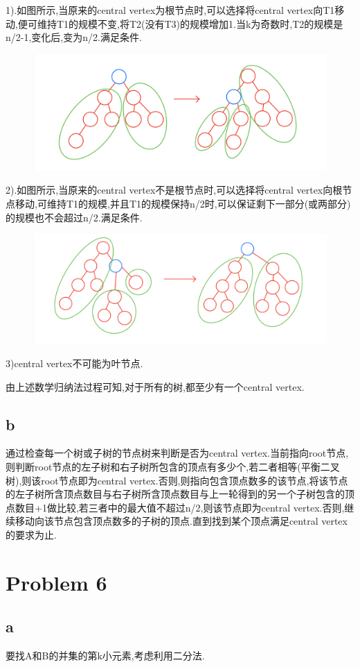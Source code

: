 \documentclass[12pt,a4paper,fontset=none]{ctexart}
\begin{document}
1).如图所示,当原来的central vertex为根节点时,可以选择将central vertex向T1移动,便可维持T1的规模不变,将T2(没有T3)的规模增加1.当k为奇数时,T2的规模是n/2-1,变化后,变为n/2.满足条件.
\begin{figure}[H]
	\centering
	\includegraphics[width=0.7\linewidth]{题图1.png}
\end{figure}
2).如图所示,当原来的central vertex不是根节点时,可以选择将central vertex向根节点移动,可维持T1的规模,并且T1的规模保持n/2时,可以保证剩下一部分(或两部分)的规模也不会超过n/2.满足条件.
\begin{figure}[H]
	\centering
	\includegraphics[width=0.7\linewidth]{题图2.png}
\end{figure}
3)central vertex不可能为叶节点.

由上述数学归纳法过程可知,对于所有的树,都至少有一个central vertex.
\subsection*{b}
通过检查每一个树或子树的节点树来判断是否为central vertex.当前指向root节点,则判断root节点的左子树和右子树所包含的顶点有多少个,若二者相等(平衡二叉树),则该root节点即为central vertex.否则,则指向包含顶点数多的该节点,将该节点的左子树所含顶点数目与右子树所含顶点数目与上一轮得到的另一个子树包含的顶点数目+1做比较,若三者中的最大值不超过n/2,则该节点即为central vertex.否则,继续移动向该节点包含顶点数多的子树的顶点.直到找到某个顶点满足central vertex的要求为止.

\section*{Problem 6}
\subsection*{a}
要找A和B的并集的第k小元素,考虑利用二分法.
\end{document}
